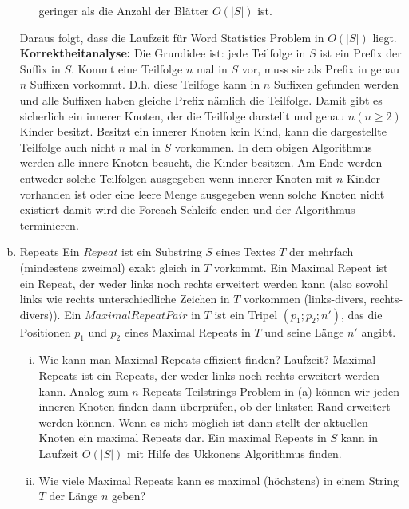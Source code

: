 \documentclass{article}
\begin{document}
\begin{flushleft}
\begin{enumerate}[(a)]
\begin{itemize}
        geringer als die Anzahl der Blätter $O(|S|)$ ist.
    \end{itemize} 
    Daraus folgt, dass die Laufzeit für Word Statistics Problem in $O(|S|)$ liegt.
    \newpage
    \textbf{Korrektheitanalyse: }
    \newline
    Die Grundidee ist: jede Teilfolge in $S$ ist ein Prefix der Suffix in $S$. 
    \newline
    Kommt eine Teilfolge $n$ mal in $S$ vor, muss sie als Prefix in genau $n$ Suffixen vorkommt.
    D.h. diese Teilfoge kann in $n$ Suffixen gefunden werden und alle Suffixen haben gleiche Prefix nämlich die Teilfolge.
    Damit gibt es sicherlich ein innerer Knoten, der die Teilfolge darstellt und genau $n(n \geq 2)$ Kinder besitzt. 
    Besitzt ein innerer Knoten kein Kind, kann die dargestellte Teilfolge auch nicht $n$ mal in $S$ vorkommen. 
    In dem obigen Algorithmus werden alle innere Knoten besucht, die Kinder besitzen. Am Ende werden entweder solche Teilfolgen
    ausgegeben wenn innerer Knoten mit $n$ Kinder vorhanden ist oder eine leere Menge ausgegeben wenn solche Knoten nicht existiert
    damit wird die Foreach Schleife enden und der Algorithmus terminieren.
    \item Repeats
    \newline
    Ein $Repeat$ ist ein Substring $S$ eines Textes $T$ der mehrfach (mindestens zweimal) exakt gleich
    in $T$ vorkommt. Ein Maximal Repeat ist ein Repeat, der weder links noch rechts erweitert werden
    kann (also sowohl links wie rechts unterschiedliche Zeichen in $T$ vorkommen (links-divers,
    rechts-divers)). Ein $Maximal Repeat Pair$ in $T$ ist ein Tripel $(p_1; p_2; n')$, das die Positionen $p_1$
    und $p_2$ eines Maximal Repeats in $T$ und seine Länge $n'$ angibt.
    \newline
    \begin{enumerate}[(i)]
        \item Wie kann man Maximal Repeats effizient finden? Laufzeit?
        \newline
        Maximal Repeats ist ein Repeats, der weder links noch rechts erweitert werden kann. Analog zum $n$ Repeats Teilstrings Problem in (a) können
        wir jeden inneren Knoten finden dann überprüfen, ob der linksten Rand erweitert werden können. Wenn es nicht möglich ist dann stellt der aktuellen Knoten ein maximal Repeats dar.
        Ein maximal Repeats in $S$ kann in Laufzeit $O(|S|)$ mit Hilfe des Ukkonens Algorithmus finden.
        \item Wie viele Maximal Repeats kann es maximal (höchstens) in einem String $T$ der Länge $n$ geben?

\end{enumerate}
\end{enumerate}
\end{flushleft}
\end{document}
